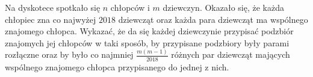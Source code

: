 \vspace{5px}



\noindent
Na dyskotece spotkało się $n$ chłopców i $m$ dziewczyn. Okazało się, że każda chłopiec zna co najwyżej $2018$ dziewcząt oraz każda para dziewcząt ma wspólnego znajomego chłopca. Wykazać, że da się każdej dziewczynie przypisać podzbiór znajomych jej chłopców w taki sposób, by przypisane podzbiory były parami rozłączne oraz by było co najmniej $\frac{m(m−1)}{2018}$ różnych par dziewcząt mających wspólnego znajomego chłopca przypisanego do jednej z nich.

\vspace{5px}

